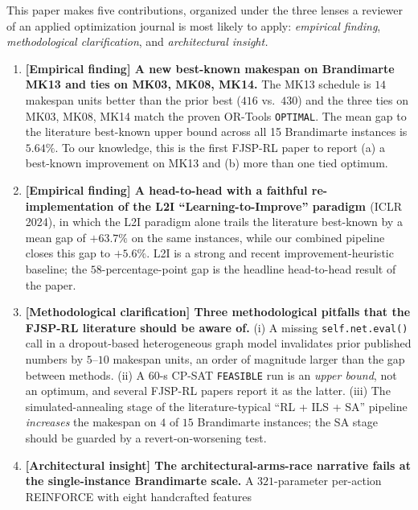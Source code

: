 \documentclass[10pt]{article}
\theoremstyle{definition}
\begin{document}
This paper makes five contributions, organized
under the three lenses a reviewer of an applied
optimization journal is most likely to apply:
\emph{empirical finding}, \emph{methodological
clarification}, and \emph{architectural insight.}
\begin{enumerate}
\item \textbf{[Empirical finding]
      A new best-known makespan on Brandimarte
      MK13 and ties on MK03, MK08, MK14.} The
      MK13 schedule is $14$ makespan units
      better than the prior best ($416$ vs.\
      $430$) and the three ties on MK03, MK08,
      MK14 match the proven OR-Tools
      \texttt{OPTIMAL}. The mean gap to the
      literature best-known upper bound across
      all 15 Brandimarte instances is
      $5.64\%$. To our knowledge, this is the
      first FJSP-RL paper to report (a) a
      best-known improvement on MK13 and (b)
      more than one tied optimum.
\item \textbf{[Empirical finding]
      A head-to-head with a faithful
      re-implementation of the L2I
      ``Learning-to-Improve'' paradigm
      \citep{Zhang2024L2I}} (ICLR 2024), in which
      the L2I paradigm alone trails the
      literature best-known by a mean gap of
      $+63.7\%$ on the same instances, while our
      combined pipeline closes this gap to
      $+5.6\%$. L2I is a strong and recent
      improvement-heuristic baseline; the
      $58$-percentage-point gap is the headline
      head-to-head result of the paper.
\item \textbf{[Methodological clarification]
      Three methodological pitfalls that the
      FJSP-RL literature should be aware of.}
      (i) A missing \texttt{self.net.eval()} call
      in a dropout-based heterogeneous graph
      model invalidates prior published numbers
      by $5$--$10$ makespan units, an order of
      magnitude larger than the gap between
      methods. (ii) A 60-s CP-SAT
      \texttt{FEASIBLE} run is an \emph{upper
      bound}, not an optimum, and several FJSP-RL
      papers report it as the latter. (iii) The
      simulated-annealing stage of the
      literature-typical ``RL + ILS + SA''
      pipeline \emph{increases} the makespan on
      $4$ of $15$ Brandimarte instances; the
      SA stage should be guarded by a
      revert-on-worsening test.
\item \textbf{[Architectural insight]
      The architectural-arms-race narrative
      fails at the single-instance Brandimarte
      scale.} A $321$-parameter per-action
      REINFORCE with eight handcrafted features

\end{enumerate}
\end{document}

